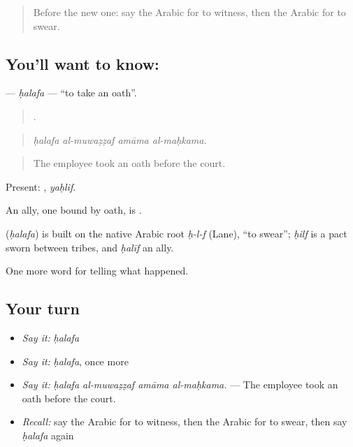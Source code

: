 \label{lesson:AR-C325-halafa}



\begin{quote}
Before the new one: say the Arabic for to witness, then the Arabic for to swear.
\end{quote}

\subsection*{You'll want to know: }
\textbf{} — \emph{ḥalafa} — \textquotedblleft{}to take an oath\textquotedblright{}.

\begin{quote}
   .
\end{quote}

\begin{quote}
\emph{ḥalafa al-muwaẓẓaf amāma al-maḥkama.}
\end{quote}

\begin{quote}
The employee took an oath before the court.
\end{quote}

Present: , \emph{yaḥlif}.

An ally, one bound by oath, is .

\begin{cousinweb}
\textbf{} (\emph{ḥalafa}) is built on the native Arabic root \emph{ḥ-l-f} (Lane), \textquotedblleft{}to swear\textquotedblright{}; \emph{ḥilf} is a pact sworn between tribes, and \emph{ḥalīf} an ally.
\end{cousinweb}

\begin{grammarlens}[title={What you've built}]
One more word for telling what happened.
\end{grammarlens}

\subsection*{Your turn}
\begin{itemize}
\raggedright
  \item \emph{Say it:} \emph{ḥalafa}
  \item \emph{Say it:} \emph{ḥalafa}, once more
  \item \emph{Say it:} \emph{ḥalafa al-muwaẓẓaf amāma al-maḥkama.} — The employee took an oath before the court.
  \item \emph{Recall:} say the Arabic for to witness, then the Arabic for to swear, then say \emph{ḥalafa} again
\end{itemize}

